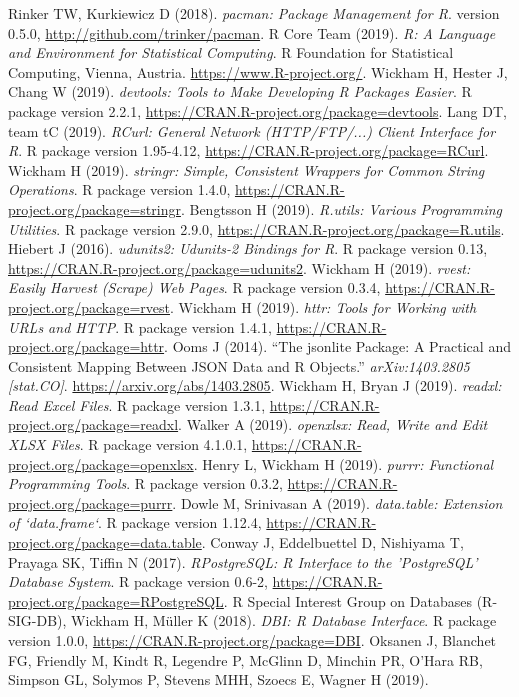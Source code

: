 Rinker TW, Kurkiewicz D (2018).
\emph{pacman: Package Management for R}.
version 0.5.0, \url{http://github.com/trinker/pacman}.
R Core Team (2019).
\emph{R: A Language and Environment for Statistical Computing}.
R Foundation for Statistical Computing, Vienna, Austria.
\url{https://www.R-project.org/}.
Wickham H, Hester J, Chang W (2019).
\emph{devtools: Tools to Make Developing R Packages Easier}.
R package version 2.2.1, \url{https://CRAN.R-project.org/package=devtools}.
Lang DT, team tC (2019).
\emph{RCurl: General Network (HTTP/FTP/...) Client Interface for R}.
R package version 1.95-4.12, \url{https://CRAN.R-project.org/package=RCurl}.
Wickham H (2019).
\emph{stringr: Simple, Consistent Wrappers for Common String Operations}.
R package version 1.4.0, \url{https://CRAN.R-project.org/package=stringr}.
Bengtsson H (2019).
\emph{R.utils: Various Programming Utilities}.
R package version 2.9.0, \url{https://CRAN.R-project.org/package=R.utils}.
Hiebert J (2016).
\emph{udunits2: Udunits-2 Bindings for R}.
R package version 0.13, \url{https://CRAN.R-project.org/package=udunits2}.
Wickham H (2019).
\emph{rvest: Easily Harvest (Scrape) Web Pages}.
R package version 0.3.4, \url{https://CRAN.R-project.org/package=rvest}.
Wickham H (2019).
\emph{httr: Tools for Working with URLs and HTTP}.
R package version 1.4.1, \url{https://CRAN.R-project.org/package=httr}.
Ooms J (2014).
``The jsonlite Package: A Practical and Consistent Mapping Between JSON Data and R Objects.''
\emph{arXiv:1403.2805 [stat.CO]}.
\url{https://arxiv.org/abs/1403.2805}.
Wickham H, Bryan J (2019).
\emph{readxl: Read Excel Files}.
R package version 1.3.1, \url{https://CRAN.R-project.org/package=readxl}.
Walker A (2019).
\emph{openxlsx: Read, Write and Edit XLSX Files}.
R package version 4.1.0.1, \url{https://CRAN.R-project.org/package=openxlsx}.
Henry L, Wickham H (2019).
\emph{purrr: Functional Programming Tools}.
R package version 0.3.2, \url{https://CRAN.R-project.org/package=purrr}.
Dowle M, Srinivasan A (2019).
\emph{data.table: Extension of `data.frame`}.
R package version 1.12.4, \url{https://CRAN.R-project.org/package=data.table}.
Conway J, Eddelbuettel D, Nishiyama T, Prayaga SK, Tiffin N (2017).
\emph{RPostgreSQL: R Interface to the 'PostgreSQL' Database System}.
R package version 0.6-2, \url{https://CRAN.R-project.org/package=RPostgreSQL}.
R Special Interest Group on Databases (R-SIG-DB), Wickham H, Müller K (2018).
\emph{DBI: R Database Interface}.
R package version 1.0.0, \url{https://CRAN.R-project.org/package=DBI}.
Oksanen J, Blanchet FG, Friendly M, Kindt R, Legendre P, McGlinn D, Minchin PR, O'Hara RB, Simpson GL, Solymos P, Stevens MHH, Szoecs E, Wagner H (2019).
